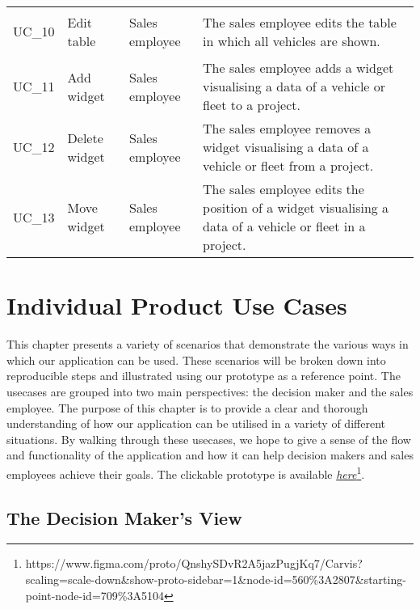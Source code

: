 \begin{footnotesize}
\begin{longtable}[i i i L]{ p{} p{} p{} p{} }
    \rowcolor{Gray}
    \hypertarget{Ref:UC10}{UC\_10} & Edit table & Sales employee & The sales employee edits the table in which all vehicles are shown.\\
    
    \hypertarget{Ref:UC11}{UC\_11} & Add \gls{widget} & Sales employee & The sales employee adds a \gls{widget} visualising a \gls{data} of a vehicle or fleet to a project.\\
    
    \rowcolor{Gray}
    \hypertarget{Ref:UC12}{UC\_12} & Delete \gls{widget} & Sales employee & The sales employee removes a \gls{widget} visualising a \gls{data} of a vehicle or fleet from a project.\\
    
    \hypertarget{Ref:UC13}{UC\_13} & Move \gls{widget} & Sales employee & The sales employee edits the position of a \gls{widget} visualising a \gls{data} of a vehicle or fleet in a project.\\
    \bottomrule
  \end{longtable}
\end{footnotesize}
\rmfamily

\section{Individual Product Use Cases}

This chapter presents a variety of scenarios that demonstrate the various ways in which our application can be used. These scenarios will be broken down into reproducible steps and illustrated using our prototype as a reference point. The \glspl{usecase} are grouped into two main perspectives: the decision maker and the sales employee. The purpose of this chapter is to provide a clear and thorough understanding of how our application can be utilised in a variety of different situations. By walking through these \glspl{usecase}, we hope to give a sense of the flow and functionality of the application and how it can help decision makers and sales employees achieve their goals.
The clickable prototype is available \href{https://www.figma.com/proto/QnshySDvR2A5jazPugjKq7/Carvis?scaling=scale-down&show-proto-sidebar=1&node-id=560%3A2807&starting-point-node-id=709%3A5104}{\emph{here}}\footnote[2]{https://www.figma.com/proto/QnshySDvR2A5jazPugjKq7/Carvis?scaling=scale-down\&show-proto-sidebar=1\&node-id=560\%3A2807\&starting-point-node-id=709\%3A5104}.

\subsection{The Decision Maker's View}

